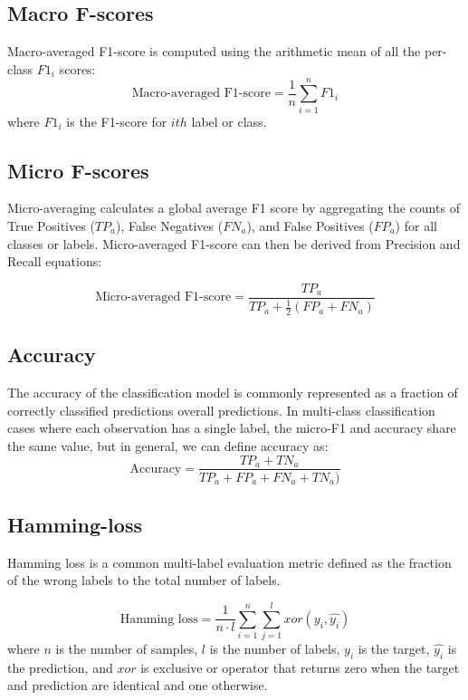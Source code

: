 \subsection{Macro F-scores}

Macro-averaged F1-score is computed using the arithmetic mean of all the per-class $F1_i$ scores:
\begin{equation*}
    \text{Macro-averaged F1-score} = \frac{1}{n}\sum_{i=1}^{n} F1_i
\end{equation*}
where $F1_i$ is the F1-score for $ith$ label or class.

\subsection{Micro F-scores}
Micro-averaging calculates a global average F1 score by aggregating the counts of True Positives ($TP_a$), False Negatives ($FN_a$), and False Positives ($FP_a$) for all classes or labels. Micro-averaged F1-score can then be derived from Precision and Recall equations:

\begin{equation*}
    \text{Micro-averaged F1-score} = \frac{TP_a}{TP_a + \frac{1}{2}(FP_a+FN_a)}
\end{equation*}

\subsection{Accuracy}
The accuracy of the classification model is commonly represented as a fraction of correctly classified predictions overall predictions. 
In multi-class classification cases where each observation has a single label, the micro-F1 and accuracy share the same value, but in general, we can define accuracy as:
\begin{equation*}
    \text{Accuracy} = \frac{TP_a + TN_a}{TP_a + FP_a + FN_a + TN_a)}
\end{equation*}

\subsection{Hamming-loss}

Hamming loss is a common multi-label evaluation metric defined as the fraction of the wrong labels to the total number of labels.

\begin{equation*}
    \text{Hamming loss} = \frac{1}{n \cdot l}\sum_{i=1}^{n}\sum_{j=1}^{l}{xor(y_i,\hat{y_i})}
\end{equation*}
where $n$ is the number of samples, $l$ is the number of labels, $y_i$ is the target, $\hat{y_i}$ is the prediction, and $xor$ is exclusive or operator that returns zero when the target and prediction are identical and one otherwise.

